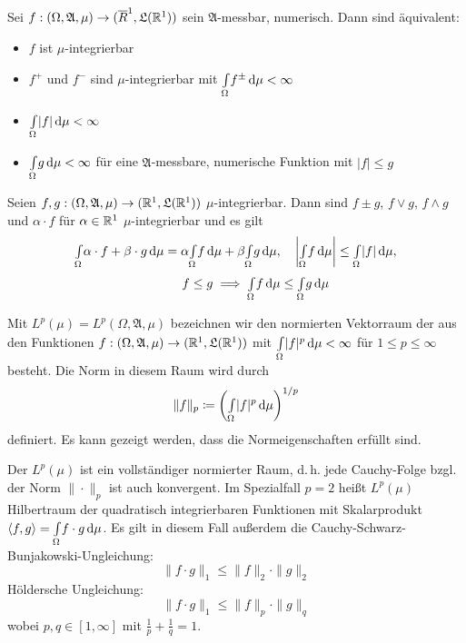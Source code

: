 \documentclass{cheat-sheet}
\newcommand{\Alg}{\mathfrak{A}}
\newcommand{\LebAlg}{\mathfrak{L}} %
\newcommand{\IntOmu}[1]{\Int{\Omega}{}{#1}{\mu}} %
\begin{document}


\begin{satz}
  Sei $f : (\Omega, \Alg, \mu) \to (\overline{R}^1, \LebAlg(\R^1))$ sein $\Alg$-messbar, numerisch. Dann sind äquivalent:
  \begin{itemize}
    \item $f$ ist $\mu$-integrierbar
    \item $f^+$ und $f^-$ sind $\mu$-integrierbar mit $\IntOmu{f^{\pm}} < \infty$
    \item $\IntOmu{|f|} < \infty$
    \item $\IntOmu{g} < \infty$ für eine $\Alg$-messbare, numerische Funktion mit $|f| \leq g$
  \end{itemize}
\end{satz}

\begin{satz}
  Seien $f, g : (\Omega, \Alg, \mu) \to (\R^1, \LebAlg(\R^1))$ $\mu$-integrierbar. Dann sind $f \pm g$, $f \vee g$, $f \wedge g$ und $\alpha \cdot f$ für $\alpha \in \mathbb{R}^1$ $\mu$-integrierbar und es gilt
  \begin{align*}
    \IntOmu{\alpha \cdot f + \beta \cdot g} = \alpha \IntOmu{f} + \beta \IntOmu{g}, & \quad
    \left| \IntOmu{f} \right| \leq \IntOmu{|f|}, \\
    f \leq g \implies \IntOmu{f} &\leq \IntOmu{g}
  \end{align*}
\end{satz}

\begin{defn}
  Mit $L^p(\mu) = L^p(\Omega, \Alg, \mu)$ bezeichnen wir den normierten Vektorraum der aus den Funktionen $f : (\Omega, \Alg, \mu) \to (\R^1, \LebAlg(\R^1))$ mit $\IntOmu{|f|^p} < \infty$ für $1 \leq p \leq \infty$ besteht. Die Norm in diesem Raum wird durch
  \[ \|f\|_p \coloneqq \left( \IntOmu{|f|^p} \right)^{1/p} \]
  definiert. Es kann gezeigt werden, dass die Normeigenschaften erfüllt sind.
\end{defn}


\begin{bem}
  Der $L^p(\mu)$ ist ein vollständiger normierter Raum, d.\,h. jede Cauchy-Folge bzgl. der Norm $\| \cdot \|_p$ ist auch konvergent. Im Spezialfall $p = 2$ heißt $L^p(\mu)$ Hilbertraum der quadratisch integrierbaren Funktionen mit Skalarprodukt $\langle f , g \rangle = \IntOmu{f \cdot g}$. Es gilt in diesem Fall außerdem die Cauchy-Schwarz-Bunjakowski-Ungleichung:
  \[ \| f \cdot g \|_{1} \leq \|f\|_2 \cdot \|g\|_2 \]
  Höldersche Ungleichung:
  \[ \| f \cdot g \|_{1} \leq \|f\|_p \cdot \|g\|_q \]
  wobei $p, q \in [1, \infty]$ mit $\tfrac{1}{p} + \tfrac{1}{q} = 1$.
\end{bem}
\end{document}
